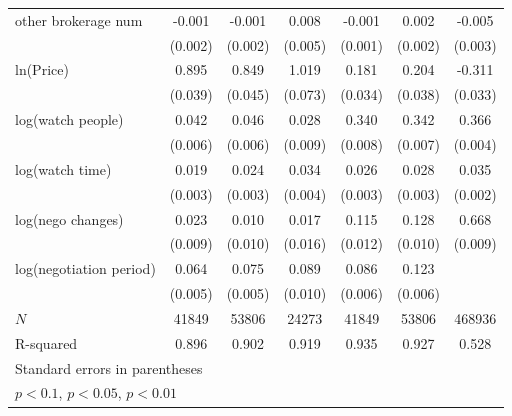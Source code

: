 {\begin{adjustbox}{max width=\textwidth}
\begin{tabular}{l*{6}{c}}
\addlinespace
other brokerage num  &      -0.001         &      -0.001         &       0.008\sym{*}  &      -0.001         &       0.002         &      -0.005         \\
            &     (0.002)         &     (0.002)         &     (0.005)         &     (0.001)         &     (0.002)         &     (0.003)         \\
\addlinespace
ln(Price)&       0.895\sym{***}&       0.849\sym{***}&       1.019\sym{***}&       0.181\sym{***}&       0.204\sym{***}&      -0.311\sym{***}\\
            &     (0.039)         &     (0.045)         &     (0.073)         &     (0.034)         &     (0.038)         &     (0.033)         \\
\addlinespace
log(watch people)&       0.042\sym{***}&       0.046\sym{***}&       0.028\sym{***}&       0.340\sym{***}&       0.342\sym{***}&       0.366\sym{***}\\
            &     (0.006)         &     (0.006)         &     (0.009)         &     (0.008)         &     (0.007)         &     (0.004)         \\
\addlinespace
log(watch time)&       0.019\sym{***}&       0.024\sym{***}&       0.034\sym{***}&       0.026\sym{***}&       0.028\sym{***}&       0.035\sym{***}\\
            &     (0.003)         &     (0.003)         &     (0.004)         &     (0.003)         &     (0.003)         &     (0.002)         \\
\addlinespace
log(nego changes)&       0.023\sym{***}&       0.010         &       0.017         &       0.115\sym{***}&       0.128\sym{***}&       0.668\sym{***}\\
            &     (0.009)         &     (0.010)         &     (0.016)         &     (0.012)         &     (0.010)         &     (0.009)         \\
\addlinespace
log(negotiation period)&       0.064\sym{***}&       0.075\sym{***}&       0.089\sym{***}&       0.086\sym{***}&       0.123\sym{***}&                     \\
            &     (0.005)         &     (0.005)         &     (0.010)         &     (0.006)         &     (0.006)         &                     \\
\midrule
\(N\)       &       41849         &       53806         &       24273         &       41849         &       53806         &      468936         \\
R-squared   &       0.896         &       0.902         &       0.919         &       0.935         &       0.927         &       0.528         \\
\bottomrule
\multicolumn{7}{l}{\footnotesize Standard errors in parentheses}\\
\multicolumn{7}{l}{\footnotesize \sym{*} \(p<0.1\), \sym{**} \(p<0.05\), \sym{***} \(p<0.01\)}\\
\end{tabular}
\end{adjustbox}
}

